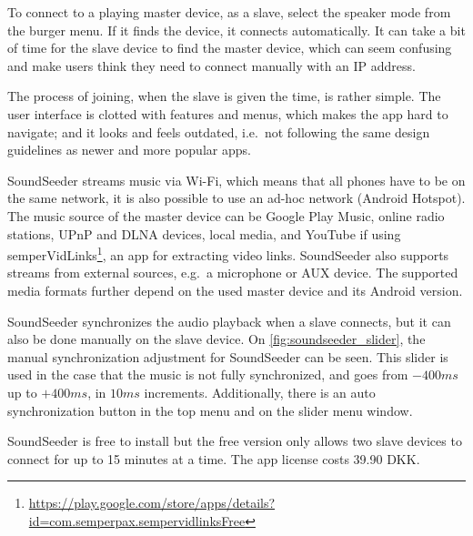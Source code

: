 To connect to a playing master device, as a slave, select the speaker mode from the burger menu.
If it finds the device, it connects automatically.
It can take a bit of time for the slave device to find the master device, which can seem confusing and make users think they need to connect manually with an IP address.

The process of joining, when the slave is given the time, is rather simple.
The user interface is clotted with features and menus, which makes the app hard to navigate; and it looks and feels outdated, i.e.\ not following the same design guidelines as newer and more popular apps.

SoundSeeder streams music via Wi-Fi,
which means that all phones have to be on the same network\cite{soundseether_faq}, it is also possible to use an ad-hoc network (Android Hotspot).
The music source of the master device can be Google Play Music, online radio stations, UPnP and DLNA devices, local media, and YouTube if using semperVidLinks\footnote{\url{https://play.google.com/store/apps/details?id=com.semperpax.sempervidlinksFree}}, an app for extracting video links.
SoundSeeder also supports streams from external sources, e.g.\ a microphone or AUX device.
The supported media formats further depend on the used master device and its Android version.\cite{soundseether_faq}

SoundSeeder synchronizes the audio playback when a slave connects, but it can also be done manually on the slave device.
On \cref{fig:soundseeder_slider}, the manual synchronization adjustment for SoundSeeder can be seen.
This slider is used in the case that the music is not fully synchronized, and goes from $-400 ms$ up to $+400 ms$, in $10 ms$ increments.
Additionally, there is an auto synchronization button in the top menu and on the slider menu window.

SoundSeeder is free to install but the free version only allows two slave devices to connect for up to 15 minutes at a time.
The app license costs 39.90 DKK\@.

